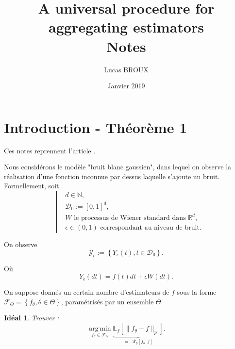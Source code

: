 \documentclass[11pt,letterpaper]{article}
\title{A universal procedure for aggregating estimators \\ Notes}
\date{Janvier 2019}
\author{Lucas BROUX}
\DeclareMathOperator*{\argmin}{arg\,min}
\newtheorem*{ideal}{Idéal}
\begin{document}
\maketitle


\pagebreak
\tableofcontents
\pagebreak


\section{Introduction - Théorème 1}

\par Ces notes reprennent l'article \cite{goldenshluger2009universal}. 

\par Nous considérons le modèle "bruit blanc gaussien", dans lequel on observe la réalisation d'une fonction inconnue par dessus laquelle s'ajoute un bruit. Formellement, soit 
\begin{equation}
 	\quad \left|
    \begin{split}
    & d \in \mathbb{N} , \\ 
    & \mathcal{D}_0 := \left[0, 1 \right]^{d} , \\
    & W \text{ le processus de Wiener standard dans } \mathbb{R}^d , \\
    & \epsilon \in \left(0, 1 \right) \text{ correspondant au niveau de bruit}.
    \end{split}
  \right.
\end{equation}

\par On observe
\begin{equation}
\mathcal{Y}_\epsilon := \left\lbrace Y_\epsilon \left( t \right), t \in \mathcal{D}_0 \right\rbrace .
\end{equation}

\par Où
\begin{equation}
Y_\epsilon \left( dt \right) = f \left( t \right) dt + \epsilon W \left( dt \right) .
\end{equation}

\par On suppose donnés un certain nombre d'estimateurs de $f$ sous la forme $\mathcal{F}_\Theta = \left\lbrace f_\theta, \theta \in \Theta \right\rbrace$, paramétrisés par un ensemble $\Theta$.

\begin{ideal}
\par Trouver :
	\begin{equation}
		\argmin\limits_{f_\theta \in \mathcal{F}_\Theta}^{} \underbrace{\mathbb{E}_f \left[ \| f_\theta - f \|_p \right]}_{=: \mathcal{R}_p \left[f_\theta; f \right]} .
	\end{equation}
\end{ideal}
\end{document}
